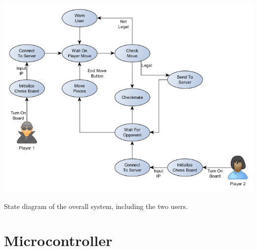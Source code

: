 \documentclass[12pt]{article}
\begin{document}
\centerline{\includegraphics[scale=.5]{High_Level_State}}

\begin{center}
State diagram of the overall system, including the two users.
\end{center}

\vspace*{5mm}

\section*{Microcontroller}
\indent
\end{document}
